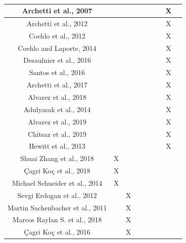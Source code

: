 \begin{center}
{%
			\\
		}
		\tablelasttail{\hline}
		\small
		\begin{supertabular}{|*{9}{c|}}
		Archetti et al., 2007 & & & & & &  & X&\\ \hline
		Archetti et al., 2012 &  & & & & & & X  &\\ \hline 
		Coehlo et al., 2012 &  & & & & & &X & \\ \hline
		Coehlo and Laporte, 2014  & & & & & & &X&  \\ \hline
		Desaulnier et al., 2016  & & & & & & & X &\\ \hline
		Santos et al., 2016 & & & & & & & X &\\ \hline
		Archetti et al., 2017 &  & & & & & & X & \\ \hline
		Alvarez et al., 2018  & & & & & & & X &\\ \hline
		Adulyasak et al., 2014  & & & & & & &X &\\ \hline
		Alvarez et al., 2019 & & & & & & & X &\\ \hline
		Chitsaz et al., 2019  & & & & & & & X &\\ \hline
		Hewitt et al., 2013  & & & & & & &X &\\ \hline
		Shuai Zhang et al., 2018 & X &  & & & & && \\ \hline
		Çagri Koç et al., 2018 & X & & & & & && \\\hline
		Michael Schneider et al., 2014 & X  &  & & & & & & \\\hline
		Sevgi Erdogan et al., 2012   & & X & & & & & & \\ \hline%
		Martin Sachenbacher et al., 2011 & & X  & & &  & &  & \\\hline 
		Marcos Raylan S. et al., 2018 & &X  &  & & & &  & \\\hline
		Çagri Koç et al., 2016 & &X & &  & & &  &\\ \hline%

\end{supertabular}
\end{center}
